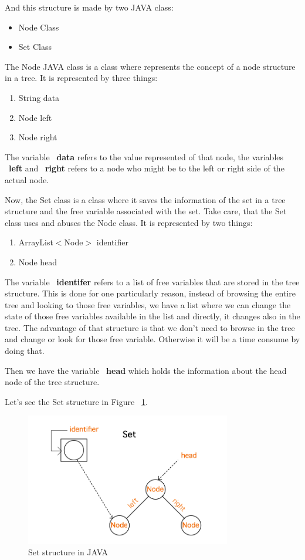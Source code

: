 \documentclass[
  oneside,
  11pt, a4paper,
  footinclude=true,
  headinclude=true,
  cleardoublepage=empty
]{scrbook}
\begin{document}
And this structure is made by two JAVA class:

\begin{itemize}
\item Node Class
\item Set Class
\end{itemize}

The Node JAVA class is a class where represents the concept of a node structure in a tree. It is represented by three things:
\begin{enumerate}
\item String data 
\item Node left
\item Node right
\end{enumerate}

The variable ~\textbf{data} refers to the value represented of that node, the variables ~\textbf{left} and ~\textbf{right} refers to a node who might be to the left or right side of the actual node.

Now, the Set class is a class where it saves the information of the set in a tree structure and the free variable associated with the set. Take care, that the Set class uses and abuses the Node class.
It is represented by two things:

\begin{enumerate}
\item ArrayList$<$Node$>$ identifier
\item Node head
\end{enumerate}

The variable ~\textbf{identifer} refers to a list of free variables that are stored in the tree structure. This is done for one particularly reason, instead of browsing the entire tree and looking to those free variables, we have a list where we can change the state of those free variables available in the list and directly, it changes also in the tree. The advantage of that structure is that we don't need to browse in the tree and change or look for those free variable. Otherwise it will be a time consume by doing that.

Then we have the variable ~\textbf{head} which holds the information about the head node of the tree structure.

Let's see the Set structure in Figure ~\ref{fig:set_structure}.

\begin{figure}[h!]
 \centering
  \includegraphics[width=0.8\textwidth]{img/set_structure.png}
  \caption{Set structure in JAVA}
  \label{fig:set_structure}
\end{figure}
\end{document}
